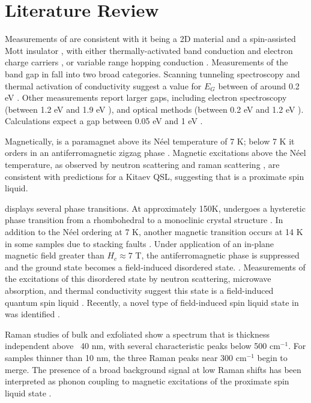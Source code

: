 \documentclass[11pt]{article}
\begin{document}
\section{Literature Review}
Measurements of \rucl are consistent with it being a 2D material \cite{Kim2015a} and a spin-assisted Mott insulator \cite{Plumb2014}, with either thermally-activated band conduction and electron charge carriers \cite{Rojas1983}, or variable range hopping conduction \cite{Mashhadi2018}. Measurements of the band gap in \rucl fall into two broad categories. Scanning tunneling spectroscopy and thermal activation of conductivity suggest a value for $E_{G}$ between of around 0.2 eV \cite{Binotto1971,Rojas1983,Ziatdinov2016}. Other measurements report larger gaps, including electron spectroscopy (between 1.2 eV and 1.9 eV \cite{Koitzsch2016,Zhou2016,Sinn2016}), and optical methods (between 0.2 eV and 1.2 eV \cite{Reschke2017,Pollini1996,Sandilands2016}). Calculations expect a gap between 0.05 eV and 1 eV  \cite{Sarikurt2017,Kim2015}.

Magnetically, \rucl is a paramagnet above its N{\'e}el temperature of 7 K; below 7 K it orders in an antiferromagnetic zigzag phase \cite{Sears2015}. Magnetic excitations above the N{\'e}el temperature, as observed by neutron scattering and raman scattering \cite{Banerjee2016,Sandilands2015}, are consistent with predictions for a Kitaev QSL, suggesting that \rucl is a proximate spin liquid.

\rucl displays several phase transitions. At approximately 150K, \rucl  undergoes a hysteretic phase transition from a rhombohedral to a monoclinic crystal structure \cite{Kubota2015,Ziatdinov2016,Glamazda2017,Reschke2017}. In addition to the N{\'e}el ordering at 7 K, another magnetic transition occurs at 14 K in some samples due to stacking faults \cite{Banerjee2016}. Under application of an in-plane magnetic field greater than $H_{c} \approx 7$ T, the antiferromagnetic phase is suppressed and the ground state becomes a field-induced disordered state. \cite{Hentrich2017,Wolter2017,Banerjee2017,Wang2017,Baek2017}. Measurements of the excitations of this disordered state by neutron scattering, microwave absorption, and thermal conductivity suggest this state is a field-induced quantum spin liquid \cite{Banerjee2016,Wellm2017,Kasahara2018}. Recently, a novel type of field-induced spin liquid state in \rucl was identified \cite{Lampen-Kelley2018}.

Raman studies of bulk and exfoliated \rucl show a spectrum that is thickness independent above ~40 nm, with several characteristic peaks below 500 cm$^{-1}$. For samples thinner than 10 nm, the three Raman peaks near 300 cm$^{-1}$ begin to merge. The presence of a broad background signal at low Raman shifts has been interpreted as phonon coupling to magnetic excitations of the proximate spin liquid state \cite{Zhou2018,Du2019}.
\end{document}
